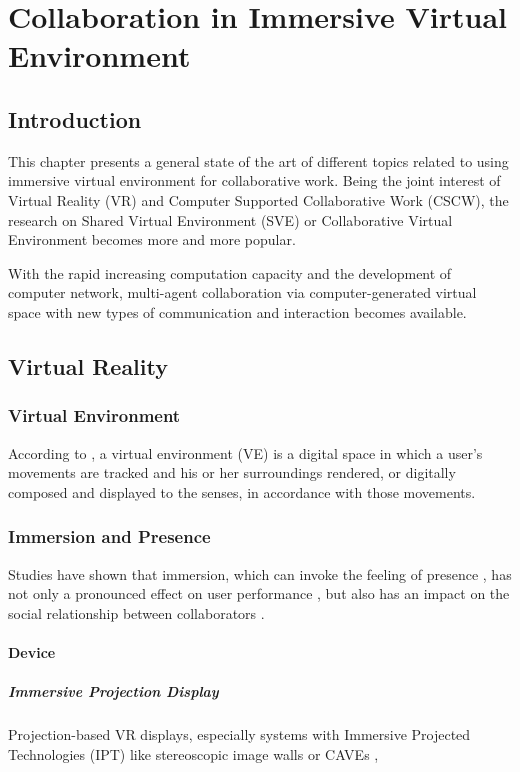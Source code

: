 \chapter{Collaboration in Immersive Virtual Environment}
\label{chapter:context}
\minitoc

\section{Introduction}
This chapter presents a general state of the art of different topics related to using immersive virtual environment for collaborative work. Being the joint interest of Virtual Reality (VR) and Computer Supported Collaborative Work (CSCW), the research on Shared Virtual Environment (SVE) or Collaborative Virtual Environment becomes more and more popular.

With the rapid increasing computation capacity and the development of computer network, multi-agent collaboration via computer-generated virtual space with new types of communication and interaction becomes available.

\section{Virtual Reality}

\subsection{Virtual Environment}
According to \citet{Fox2009Guide}, a virtual environment (VE) is a digital space in which a user's movements are tracked and his or her surroundings rendered, or digitally composed and displayed to the senses, in accordance with those movements.


\subsection{Immersion and Presence}
Studies have shown that immersion, which can invoke the feeling of presence \citep{Slater1994DepthPre}, has not only a pronounced effect on user performance \citep{Dangelo2008Benefits}, but also has an impact on the social relationship between collaborators \citep{Slater2000Small}.



\subsubsection{Device}
\paragraph{Immersive Projection Display}
Projection-based VR displays, especially systems with Immersive Projected Technologies (IPT) like stereoscopic image walls or CAVEs \citep{CruzNeira1993SPV}, 


